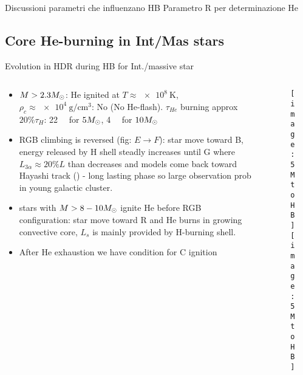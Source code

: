 \begin{frame}{Discussioni parametri che influenzano HB}
Parametro R per determinazione He
\end{frame}

\subsection{Core He-burning in Int/Mas stars}

\begin{frame}{Evolution in HDR during HB for Int./massive star}
\begin{columns}[T]
	\begin{column}{0.55\textwidth}
	\begin{itemize}
	\item $M>2.3M_{\odot}$: He ignited at $T\approx\SI{e8}{\kelvin}$, $\rho_c\approx\SI{e4}{\gram\per\cubic\cm}$: No \Pelectron (No He-flash). $\tau_{He}$ burning approx $20\%\tau_H$: \SI{22}{\mega\year} for $5M_{\odot}$, \SI{4}{\mega\year} for $10M_{\odot}$
	\item RGB climbing is reversed (fig: $E\to F$): star move toward B, energy released by H shell steadly increases until G where $L_{3\alpha}\approx20\%L$ than decreases and models come back toward Hayashi track () - long lasting phase so large observation prob in young galactic cluster.
	\item stars with $M>8-10M_{\odot}$ ignite He before RGB configuration: star move toward R and He burns in growing convective core, $L_s$ is mainly provided by H-burning shell.
	\item After He exhaustion we have condition for C ignition
	\end{itemize}
	\end{column}
	\begin{column}{0.45\textwidth}
	\begin{figure}[!ht]
	\texttt{[image: 5MtoHB]}\label{fig:5MtoHB}
	\texttt{[image: 5MtoHB]}\label{fig:5MtoHB}
	\end{figure}
\end{column}\end{columns}
\end{frame}

